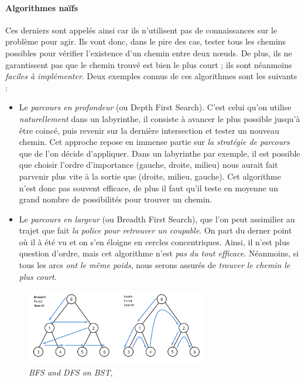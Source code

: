 \paragraph{Algorithmes naïfs} Ces derniers sont appelés ainsi car ils n'utilisent pas de connaissances sur le problème
pour agir. Ils vont donc, dans le pire des cas, tester tous les chemins possibles pour vérifier l'existence d'un chemin
entre deux n\oe{}uds. De plus, ils ne garantissent pas que le chemin trouvé est bien le plus court ; ils sont 
néanmoins \emph{faciles à implémenter}. Deux exemples connus de ces algorithmes sont les suivants :
\begin{itemize}
    \item Le \emph{parcours en profondeur} (ou Depth First Search). C'est celui qu'on utilise \emph{naturellement} dans un labyrinthe, il consiste
    à avancer le plus possible jusqu'à être coincé, puis revenir sur la dernière intersection et tester un nouveau chemin.
    Cet approche repose en immense partie sur \emph{la stratégie de parcours} que de l'on décide d'appliquer. Dans un labyrinthe
    par exemple, il est possible que choisir l'ordre d'importance (gauche, droite, milieu) nous aurait fait parvenir plus vite
    à la sortie que (droite, milieu, gauche). Cet algorithme n'est donc pas souvent efficace, de plus il faut qu'il teste
    en moyenne un grand nombre de possibilités pour trouver un chemin.
    \item Le \emph{parcours en largeur} (ou Breadth First Search), que l'on peut assimilier au trajet que fait \emph{la police pour retrouver un
    coupable}. On part du derner point où il à été vu et on s'en éloigne en cercles concentriques. Ainsi, il n'est plus
    question d'ordre, mais cet algorithme n'est \emph{pas du tout efficace}. Néanmoins, si tous les arcs \emph{ont le
    même poids}, nous serons assurés de \emph{trouver le chemin le plus court}.
\end{itemize}

\begin{figure}[h]
    \centering
    \includegraphics[width=300px]{chapters/03/images/bfs-dfs-bst.png}
    \caption{\label{bfs-dfs}\emph{BFS and DFS on BST}, \cite{Algorithm0}}
\end{figure}

